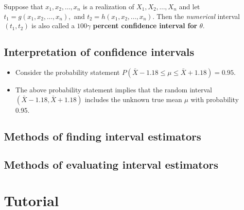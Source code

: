 \documentclass[]{book}
\begin{document}
Suppose that \(x_1, x_2, \dots, x_n\) is a realization of \(X_1, X_2, \dots, X_n\) and let \(t_1 = g(x_1, x_2, \dots, x_n),\) and \(t_2 = h(x_1, x_2, \dots, x_n)\). Then the \emph{numerical} interval \((t_1, t_2)\) is also called a \(100\gamma\) \textbf{percent confidence interval for} \(\theta\).

\hypertarget{interpretation-of-confidence-intervals}{%
\subsection{Interpretation of confidence intervals}\label{interpretation-of-confidence-intervals}}

\begin{itemize}
\item
  Consider the probability statement \(P(\bar{X}-1.18 \leq \mu\leq \bar{X}+1.18) =0.95.\)
\item
  The above probability statement implies that the random interval \((\bar{X}-1.18, \bar{X}+1.18)\) includes the unknown true mean \(\mu\) with probability 0.95.
\end{itemize}

\newpage

\hypertarget{methods-of-finding-interval-estimators}{%
\subsection{Methods of finding interval estimators}\label{methods-of-finding-interval-estimators}}

\hypertarget{methods-of-evaluating-interval-estimators}{%
\subsection{Methods of evaluating interval estimators}\label{methods-of-evaluating-interval-estimators}}

\newpage
{}

\hypertarget{tutorial-1}{%
\section*{Tutorial}\label{tutorial-1}}
\end{document}
